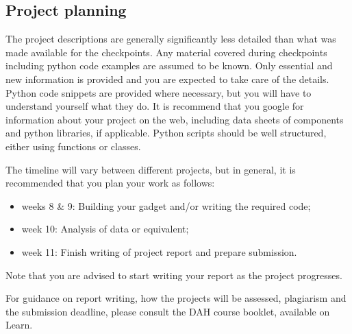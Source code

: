 \subsection{Project planning}

The project descriptions are generally significantly less detailed than what was made available for the checkpoints. Any material covered during checkpoints including python code examples are assumed to be known.  Only essential and new information is provided and you are expected to take care of the details. Python code snippets are provided where necessary, but you will have to understand yourself what they do. It is recommend that you google for information about your project on the web, including data sheets of components and python libraries, if applicable. Python scripts should be well structured, either using functions or classes.

The timeline will vary between different projects, but in general, it is recommended that you plan your work as follows:
\begin{itemize}
\item	weeks 8 \& 9: 	Building your gadget and/or writing the required code;
\item	week 10: 	Analysis of data or equivalent;
\item	week 11:	Finish writing of project report and prepare submission.
\end{itemize}
Note that you are advised to start writing your report as the project progresses. 

For guidance on report writing, how the projects will be assessed, plagiarism and the submission deadline, please consult the DAH course booklet, available on Learn.

